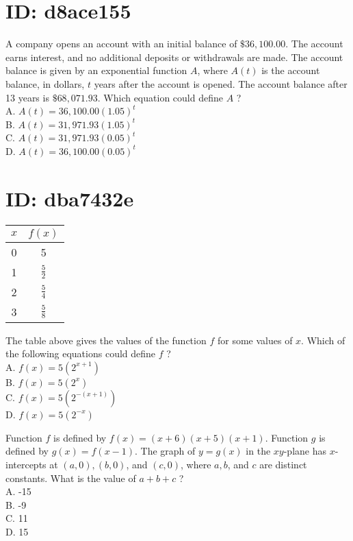\section*{ID: d8ace155}
A company opens an account with an initial balance of $\$ 36,100.00$. The account earns interest, and no additional deposits or withdrawals are made. The account balance is given by an exponential function $A$, where $A(t)$ is the account balance, in dollars, $t$ years after the account is opened. The account balance after 13 years is $\$ 68,071.93$. Which equation could define $A$ ?\\
A. $A(t)=36,100.00(1.05)^{t}$\\
B. $A(t)=31,971.93(1.05)^{t}$\\
C. $A(t)=31,971.93(0.05)^{t}$\\
D. $A(t)=36,100.00(0.05)^{t}$

\section*{ID: dba7432e}
\begin{center}
\begin{tabular}{|c|c|}
\hline
$x$ & $f(x)$ \\
\hline
0 & 5 \\
\hline
1 & $\frac{5}{2}$ \\
\hline
2 & $\frac{5}{4}$ \\
\hline
3 & $\frac{5}{8}$ \\
\hline
\end{tabular}
\end{center}

The table above gives the values of the function $f$ for some values of $x$. Which of the following equations could define $f$ ?\\
A. $f(x)=5\left(2^{x+1}\right)$\\
B. $f(x)=5\left(2^{x}\right)$\\
C. $f(x)=5\left(2^{-(x+1)}\right)$\\
D. $f(x)=5\left(2^{-x}\right)$

Function $f$ is defined by $f(x)=(x+6)(x+5)(x+1)$. Function $g$ is defined by $g(x)=f(x-1)$. The graph of $y=g(x)$ in the $x y$-plane has $x$-intercepts at $(a, 0),(b, 0)$, and $(c, 0)$, where $a, b$, and $c$ are distinct constants. What is the value of $a+b+c$ ?\\
A. -15\\
B. -9\\
C. 11\\
D. 15

